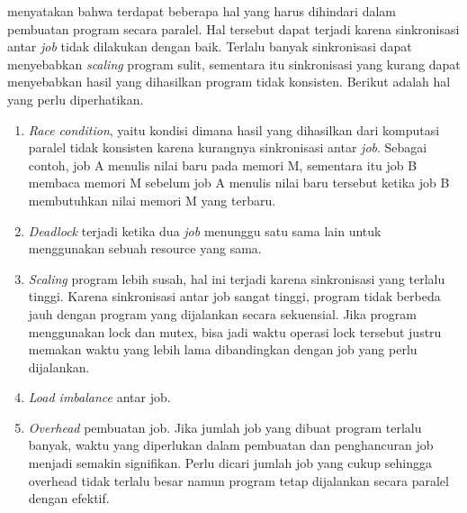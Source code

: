   \citep{structured_parallel_programming} menyatakan bahwa terdapat beberapa hal yang harus dihindari dalam pembuatan program secara paralel. Hal tersebut dapat terjadi karena sinkronisasi antar \textit{job} tidak dilakukan dengan baik. Terlalu banyak sinkronisasi dapat menyebabkan \textit{scaling} program sulit, sementara itu sinkronisasi yang kurang dapat menyebabkan hasil yang dihasilkan program tidak konsisten. Berikut adalah hal yang perlu diperhatikan.
  \begin{enumerate}[label=\roman*.]
    \item \textit{Race condition}, yaitu kondisi dimana hasil yang dihasilkan dari komputasi paralel tidak konsisten karena kurangnya sinkronisasi antar \textit{job}. Sebagai contoh, job A menulis nilai baru pada memori M, sementara itu job B membaca memori M sebelum job A menulis nilai baru tersebut ketika job B membutuhkan nilai memori M yang terbaru.
    \item \textit{Deadlock} terjadi ketika dua \textit{job} menunggu satu sama lain untuk menggunakan sebuah resource yang sama.
    \item \textit{Scaling} program lebih susah, hal ini terjadi karena sinkronisasi yang terlalu tinggi. Karena sinkronisasi antar job sangat tinggi, program tidak berbeda jauh dengan program yang dijalankan secara sekuensial. Jika program menggunakan lock dan mutex, bisa jadi waktu operasi lock tersebut justru memakan waktu yang lebih lama dibandingkan dengan job yang perlu dijalankan.
    \item \textit{Load imbalance} antar job.
    \item \textit{Overhead} pembuatan job. Jika jumlah job yang dibuat program terlalu banyak, waktu yang diperlukan dalam pembuatan dan penghancuran job menjadi semakin signifikan. Perlu dicari jumlah job yang cukup sehingga overhead tidak terlalu besar namun program tetap dijalankan secara paralel dengan efektif.
  \end{enumerate}
